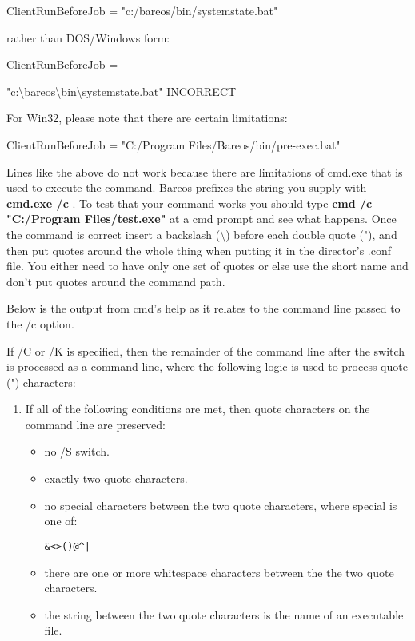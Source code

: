\begin{description}
\begin{enumerate}
ClientRunBeforeJob = "c:/bareos/bin/systemstate.bat"

rather than DOS/Windows form:

ClientRunBeforeJob =

"c:\textbackslash{}bareos\textbackslash{}bin\textbackslash{}systemstate.bat"
   INCORRECT
   \end{enumerate}

For Win32, please note that there are certain limitations:

ClientRunBeforeJob = "C:/Program Files/Bareos/bin/pre-exec.bat"

Lines like the above do not work because there are limitations of
cmd.exe that is used to execute the command.
Bareos prefixes the string you supply with {\bf cmd.exe /c }.  To test that
your command works you should type {\bf cmd /c "C:/Program Files/test.exe"} at a
cmd prompt and see what happens.  Once the command is correct insert a
backslash (\textbackslash{}) before each double quote ("), and
then put quotes around the whole thing when putting it in
the director's .conf file.  You either need to have only one set of quotes
or else use the short name and don't put quotes around the command path.

Below is the output from cmd's help as it relates to the command line
passed to the /c option.

If /C or /K is specified, then the remainder of the command line after
the switch is processed as a command line, where the following logic is
used to process quote (") characters:

\begin{enumerate}
\item
If all of the following conditions are met, then quote characters
on the command line are preserved:
\begin{itemize}
\item no /S switch.
\item exactly two quote characters.
\item no special characters between the two quote characters,
where special is one of:
\begin{verbatim}
&<>()@^|
\end{verbatim}
\item there are one or more whitespace characters between the
the two quote characters.
\item the string between the two quote characters is the name
of an executable file.
\end{itemize}


\end{enumerate}
\end{description}
